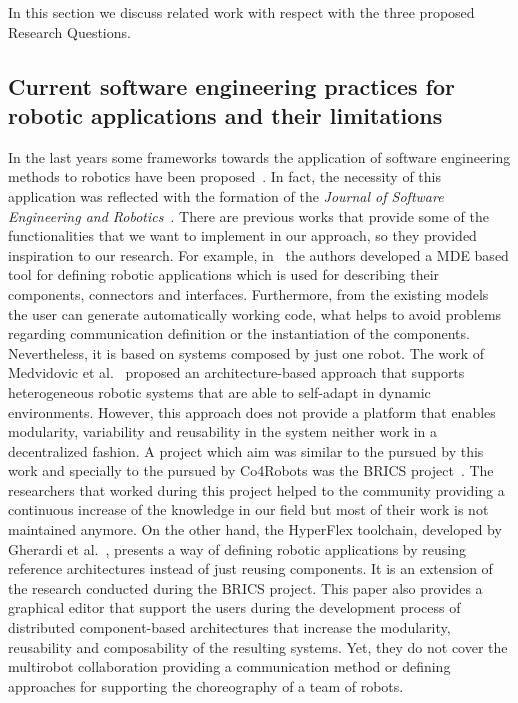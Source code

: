 In this section we discuss related work with respect with the three proposed Research Questions.

\subsection{Current software engineering practices for robotic applications and their limitations}

In the last years some frameworks towards the application of software engineering methods to robotics have been proposed~\cite{Ramaswamy2014}.
In fact, the necessity of this application was reflected with the formation of the \emph{Journal of Software Engineering and Robotics}~\cite{Brugali2010_journal}.
There are previous works that provide some of the functionalities that we want to implement in our approach, so they provided inspiration to our research.
For example, in~\cite{wenger} the authors developed a MDE based tool for defining robotic applications which is used for describing their components, connectors and interfaces.
Furthermore, from the existing models the user can generate automatically working code, what helps to avoid problems regarding communication definition or the instantiation of the components.
Nevertheless, it is based on systems composed by just one robot.
The work of Medvidovic et al.~\cite{medvidovic} proposed an architecture-based approach that supports heterogeneous robotic systems that are able to self-adapt in dynamic environments.
However, this approach does not provide a platform that enables modularity, variability and reusability in the system neither work in a decentralized fashion.
A project which aim was similar to the pursued by this work and specially to the pursued by Co4Robots was the BRICS project~\cite{Bischoff2010}. 
The researchers that worked during this project helped to the community providing a continuous increase of the knowledge in our field but most of their work is not maintained anymore.
On the other hand, the HyperFlex toolchain, developed by Gherardi et al.~\cite{gherardi}, presents a way of defining robotic applications by reusing reference architectures instead of just reusing components.
It is an extension of the research conducted during the BRICS project.
This paper also provides a graphical editor that support the users during the development process of distributed component-based architectures that increase the modularity, reusability and composability of the resulting systems.
Yet, they do not cover the multirobot collaboration providing a communication method or defining approaches for supporting the choreography of a team of robots.

